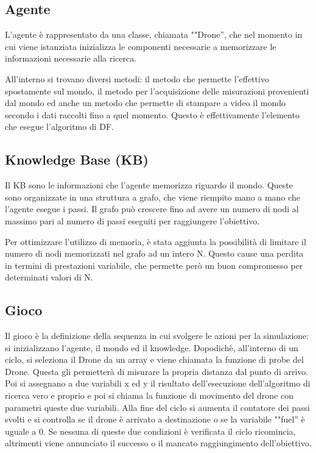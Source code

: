 \subsection{Agente}
L'agente è rappresentato da una classe, chiamata ""Drone'', che nel momento in cui viene istanziata inizializza le componenti necessarie a memorizzare le informazioni necessarie alla ricerca. 

All'interno si trovano diversi metodi: il metodo che permette l'effettivo spostamente sul mondo, il metodo per l'acquisizione delle misurazioni provenienti dal mondo ed anche un metodo che permette di stampare a video il mondo secondo i dati raccolti fino a quel momento. Questo è effettivamente l'elemento che esegue l'algoritmo di DF.

\subsection{Knowledge Base (KB)}
Il KB sono le informazioni che l'agente memorizza riguardo il mondo. Queste sono organizzate in una struttura a grafo, che viene riempito mano a mano che l'agente esegue i passi. Il grafo può crescere fino ad avere un numero di nodi al massimo pari al numero di passi eseguiti per raggiungere l'obiettivo. 

Per ottimizzare l'utilizzo di memoria, è stata aggiunta la possibilità di limitare il numero di nodi memorizzati nel grafo ad un intero N. Questo cause una perdita in termini di prestazioni variabile, che permette però un buon compromesso per determinati valori di N.

\subsection{Gioco}
Il gioco è la definizione della sequenza in cui svolgere le azioni per la simulazione: si inizializzano l'agente, il mondo ed il knowledge. Dopodichè, all'interno di un ciclo, si seleziona il Drone da un array e viene chiamata la funzione di probe del Drone. Questa gli permetterà di misurare la propria distanza dal punto di arrivo. Poi si assegnano a due variabili x ed y il risultato dell'esecuzione dell'algoritmo di ricerca vero e proprio e poi si chiama la funzione di movimento del drone con parametri queste due variabili. Alla fine del ciclo si aumenta il contatore dei passi svolti e si controlla se il drone è arrivato a destinazione o se la variabile ""fuel'' è uguale a 0. Se nessuna di queste due condizioni è verificata il ciclo ricomincia, altrimenti viene annunciato il successo o il mancato raggiungimento dell'obiettivo.
	
